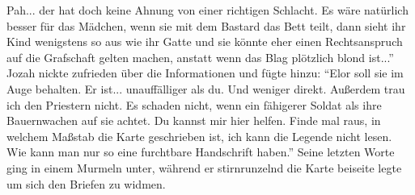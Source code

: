 Pah... der hat doch keine Ahnung von einer richtigen Schlacht. Es wäre natürlich besser für das 
Mädchen, wenn sie mit dem Bastard das Bett teilt, dann sieht ihr Kind wenigstens so aus wie ihr 
Gatte und sie könnte eher einen Rechtsanspruch auf die Grafschaft gelten machen, anstatt wenn das 
Blag plötzlich blond ist...''\\
Jozah nickte zufrieden über die Informationen und fügte hinzu: ``Elor soll sie im Auge behalten. Er 
ist... unauffälliger als du. Und weniger direkt. Außerdem trau ich den Priestern nicht. Es schaden 
nicht, wenn ein fähigerer Soldat als ihre Bauernwachen auf sie achtet. Du kannst mir hier helfen. 
Finde mal raus, in welchem Maßstab die Karte geschrieben ist, ich kann die Legende nicht lesen. Wie 
kann man nur so eine furchtbare Handschrift haben.'' Seine letzten Worte ging in einem Murmeln 
unter, während er stirnrunzelnd die Karte beiseite legte um sich den Briefen zu widmen.\\


